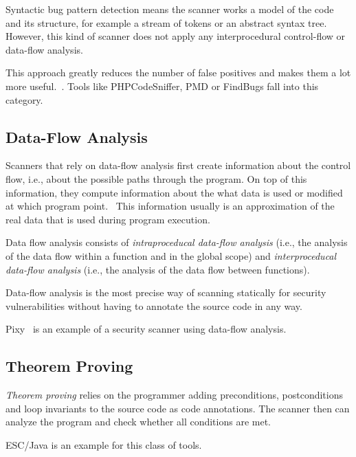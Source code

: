 Syntactic bug pattern detection means the scanner works a model of the code and its structure, for example a stream of tokens or an abstract syntax tree. However, this kind of scanner does not apply any interprocedural control-flow or data-flow analysis.

This approach greatly reduces the number of false positives and makes them a lot more useful.~\cite{comparison-of-bug-finding-tools}. Tools like PHPCodeSniffer, PMD or FindBugs fall into this category.


\subsection{Data-Flow Analysis}

Scanners that rely on data-flow analysis first create information about the control flow, i.e., about the possible paths through the program. On top of this information, they compute information about the what data is used or modified at which program point.~\cite{data-flow-analysis} This information usually is an approximation of the real data that is used during program execution.

Data flow analysis consists of \emph{intraproceducal data-flow analysis} (i.e., the analysis of the data flow within a function and in the global scope) and \emph{interproceducal data-flow analysis} (i.e., the analysis of the data flow between functions).

Data-flow analysis is the most precise way of scanning statically for security vulnerabilities without having to annotate the source code in any way.

Pixy~\cite{pixy} is an example of a security scanner using data-flow analysis.


\subsection{Theorem Proving}

\emph{Theorem proving} relies on the programmer adding preconditions, postconditions and loop invariants to the source code as code annotations. The scanner then can analyze the program and check whether all conditions are met.~\cite{comparison-of-bug-finding-tools}

ESC/Java is an example for this class of tools.


